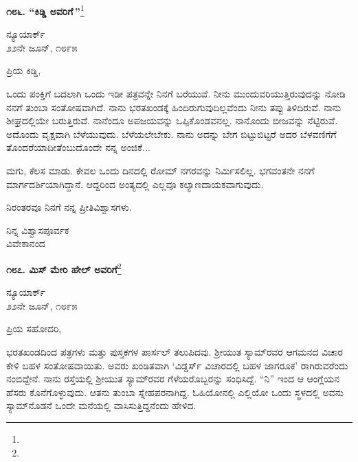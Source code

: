 \begin{center}
\textbf{೧೮೬. “ಕಿಡ್ಡಿ ಅವರಿಗೆ\,”}\footnote{}
\end{center}

\vspace{-0.7cm}

\begin{flushright}
ನ್ಯೂಯಾರ್ಕ್\\೨೨ನೇ ಜೂನ್, ೧೮೯೫
\end{flushright}

\vspace{-0.3cm}

\noindent
ಪ್ರಿಯ ಕಿಡ್ಡಿ,

ಒಂದು ಪಂಕ್ತಿಗೆ ಬದಲಾಗಿ ಒಂದು ಇಡೀ ಪತ್ರವನ್ನೇ ನಿನಗೆ ಬರೆಯುವೆ. ನೀನು ಮುಂದುವರಿಯುತ್ತಿರುವುದನ್ನು ನೋಡಿ ನನಗೆ ತುಂಬಾ ಸಂತೋಷವಾಗಿದೆ. ನಾನು ಭರತಖಂಡಕ್ಕೆ ಹಿಂದಿರುಗುವುದಿಲ್ಲವೆಂದು ನೀನು ತಪ್ಪು ತಿಳಿದಿರುವೆ. ನಾನು ಶೀಘ್ರದಲ್ಲಿಯೇ ಬರುತ್ತಿರುವೆ. ನಾನೆಂದೂ ಅಪಜಯವನ್ನು ಒಪ್ಪಿಕೊಂಡವನಲ್ಲ. ನಾನೊಂದು ಬೀಜವನ್ನು ನೆಟ್ಟಿರುವೆ. ಅದೊಂದು ವೃಕ್ಷವಾಗಿ ಬೆಳೆಯುವುದು. ಬೆಳೆಯಲೇಬೇಕು. ನಾನು ಅದನ್ನು ಬೇಗ ಬಿಟ್ಟುಬಿಟ್ಟರೆ ಅದರ ಬೆಳವಣಿಗೆಗೆ ತೊಂದರೆಯಾದೀತೆಂಬುದೊಂದೇ ನನ್ನ ಅಂಜಿಕೆ...

ಮಗು, ಕೆಲಸ ಮಾಡು. ಕೇವಲ ಒಂದು ದಿನದಲ್ಲಿ ರೋಮ್ ನಗರವನ್ನು ನಿರ್ಮಿಸಲಿಲ್ಲ. ಭಗವಂತನೇ ನನಗೆ ಮಾರ್ಗದರ್ಶಿಯಾಗಿದ್ದಾನೆ. ಆದ್ದರಿಂದ ಅಂತ್ಯದಲ್ಲಿ ಎಲ್ಲವೂ ಕಲ್ಯಾಣದಾಯಕವಾಗುವುದು.

ನಿರಂತರವೂ ನಿನಗೆ ನನ್ನ ಪ್ರೀತಿವಿಶ್ವಾಸಗಳು.

\vspace{-0.5cm}

{\flushright
ನಿನ್ನ ವಿಶ್ವಾಸಪೂರ್ವಕ\\ವಿವೇಕಾನಂದ\par}

\begin{center}
\textbf{೧೮೭. ಮಿಸ್ ಮೇರಿ ಹೇಲ್‌ ಅವರಿಗೆ}\footnote{}
\end{center}

\vspace{-0.6cm}

\begin{flushright}
ನ್ಯೂಯಾರ್ಕ್\\೨೨ನೇ ಜೂನ್, ೧೮೯೫
\end{flushright}

\vspace{-0.3cm}

\noindent
ಪ್ರಿಯ ಸಹೋದರಿ,

ಭರತಖಂಡದಿಂದ ಪತ್ರಗಳು ಮತ್ತು ಪುಸ್ತಕಗಳ ಪಾರ್ಸಲ್ ತಲುಪಿದವು. ಶ‍್ರೀಯುತ ಸ್ಯಾಮ್‌ರವರ ಆಗಮನದ ವಿಚಾರ ಕೇಳಿ ಬಹಳ ಸಂತೋಷವಾಯಿತು. ಅವರು ಖಂಡಿತವಾಗಿ `ವಿಡ್ಡರ್ಸ್ ವಿಚಾರದಲ್ಲಿ ಬಹಳ ಜಾಗರೂಕ' ರಾಗಿರುವರೆಂದು ನಂಬಿದ್ದೇನೆ. ನಾನು ರಸ್ತೆಯಲ್ಲಿ ಶ‍್ರೀಯುತ ಸ್ಯಾಮ್‌ರವರ ಗೆಳೆಯರೊಬ್ಬರನ್ನು ಸಂಧಿಸಿದ್ದೆ. ``ನಿ” ಇಂದ ಆ ಆಂಗ್ಲೆಯನ ಹೆಸರು ಕೊನೆಗೊಳ್ಳುವುದು. ಆತನು ತುಂಬಾ ಸ್ನೇಹಪರನಾಗಿದ್ದ. ಓಹಿಯೋನಲ್ಲಿ ಎಲ್ಲಿಯೋ ಒಂದು ಸ್ಥಳದಲ್ಲಿ ಅವನು ಸ್ಯಾಮ್‌ನೊಡನೆ ಒಂದೇ ಮನೆಯಲ್ಲಿ ವಾಸಿಸುತ್ತಿದ್ದನೆಂದು ಹೇಳಿದ.

